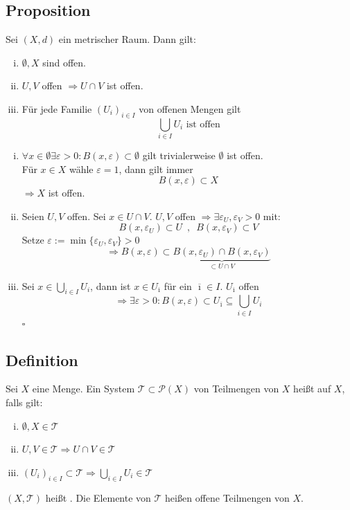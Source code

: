 \subsection[Proposition über Eigenschaften metrischer Räume]{Proposition} %
\label{sub:25}
Sei $(X,d)$ ein metrischer Raum. Dann gilt:
\begin{enumerate}[(i)]
	\item $\emptyset, X$ sind offen.
	\item $U,V$ offen $\Rightarrow U \cap V$ ist offen.
	\item Für jede Familie $(U_i)_{i \in I}$ von offenen Mengen gilt 
	\[
		\bigcup_{i \in I} U_i \text{ ist offen}
	\]
\end{enumerate}
\begin{enumerate}[(i)]
	\item $\forall x \in \emptyset \exists \varepsilon >0 : B(x,\varepsilon) \subset \emptyset$ gilt trivialerweise $\emptyset$ ist offen. \\
	Für $x \in X$ wähle $\varepsilon = 1$, dann gilt immer
	\[
		B(x,\varepsilon) \subset X
	\]
	$\Rightarrow X$ ist offen.
	\item  Seien $U,V$ offen. Sei $x \in U \cap V$. $U,V$ offen $\Rightarrow \exists \varepsilon_U, \varepsilon_V >0$ mit:
	\[
		B(x,\varepsilon_U) \subset U \enspace , \enspace B(x,\varepsilon_V) \subset V
	\]
	Setze $\varepsilon := \min  \{ \varepsilon_U , \varepsilon_V  \} >0$
	\[
		\Rightarrow  B(x,\varepsilon) \subset \underbrace{B(x,\varepsilon_U) \cap B(x,\varepsilon_V)}_{\subset U \cap V}
	\]
	\item Sei $x \in \bigcup_{i \in I} U_i$, dann ist $x \in U_{\overline{\imath} }$ für ein $\overline{\imath} \in I $. $U_{\overline{\imath}}$ offen 
	\[
		\Rightarrow \exists \varepsilon >0 : B(x,\varepsilon) \subset U_{\overline{\imath}} \subseteq \bigcup_{i \in I} U_i
	\]
	\hfill \( \square \)
\end{enumerate}

\subsection[Definition Topologie, topologischer Raum]{Definition} %
\label{sub:26}
Sei $X$ eine Menge. Ein System $\mathcal{T} \subset \mathcal{P}(X)$ von Teilmengen von $X$ heißt  auf $X$, falls gilt:
\begin{enumerate}[(i)]
	\item $\emptyset , X \in \mathcal{T} $
	\item $U,V \in \mathcal{T} \Longrightarrow U \cap V \in \mathcal{T}$
	\item $(U_i)_{i \in I} \subset \mathcal{T} \Longrightarrow \bigcup_{i \in I} U_i \in \mathcal{T}$
\end{enumerate} 
$(X,\mathcal{T})$ heißt . Die Elemente von $\mathcal{T}$ heißen offene Teilmengen von $X$.

